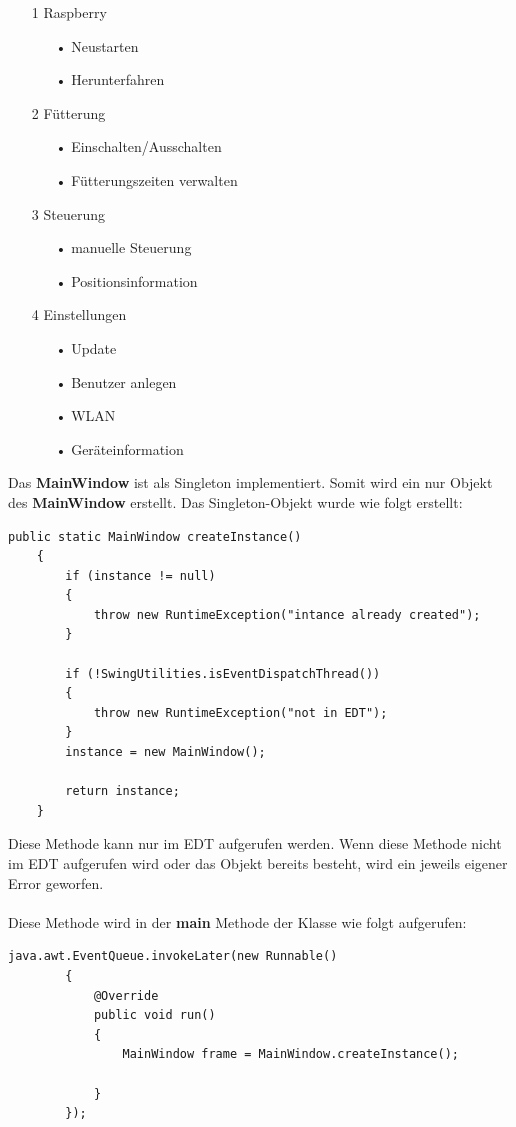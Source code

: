 \begin{itemize}
\item[1] Raspberry
\begin{itemize}
\item[•] Neustarten
\item[•] Herunterfahren
\end{itemize}
\item[2] Fütterung
\begin{itemize}
\item[•] Einschalten/Ausschalten
\item[•] Fütterungszeiten verwalten
\end{itemize}
\item[3] Steuerung
\begin{itemize}
\item[•] manuelle Steuerung
\item[•] Positionsinformation
\end{itemize}
\item[4] Einstellungen
\begin{itemize}
\item[•] Update
\item[•] Benutzer anlegen
\item[•] WLAN
\item[•] Geräteinformation
\end{itemize}
\end{itemize}

\vspace{10pt}

Das \textbf{MainWindow} ist als Singleton implementiert. Somit wird ein nur Objekt des \textbf{MainWindow} erstellt. Das Singleton-Objekt wurde wie folgt erstellt:
\begin{lstlisting}[style=JavaStyle, caption=MainWindow createInstance()]
public static MainWindow createInstance()
    {
        if (instance != null)
        {
            throw new RuntimeException("intance already created");
        }

        if (!SwingUtilities.isEventDispatchThread())
        {
            throw new RuntimeException("not in EDT");
        }
        instance = new MainWindow();

        return instance;
    }
\end{lstlisting}
Diese Methode kann nur im EDT aufgerufen werden. Wenn diese Methode nicht im EDT aufgerufen wird oder das Objekt bereits besteht, wird ein jeweils eigener Error geworfen.
\\ \\ Diese Methode wird in der \textbf{main} Methode der Klasse wie folgt aufgerufen:
\begin{lstlisting}[style=JavaStyle, caption=MainWindow createInstance() Aufruf]
	java.awt.EventQueue.invokeLater(new Runnable()
        {
            @Override
            public void run()
            {
                MainWindow frame = MainWindow.createInstance();

            }
        });
\end{lstlisting}

